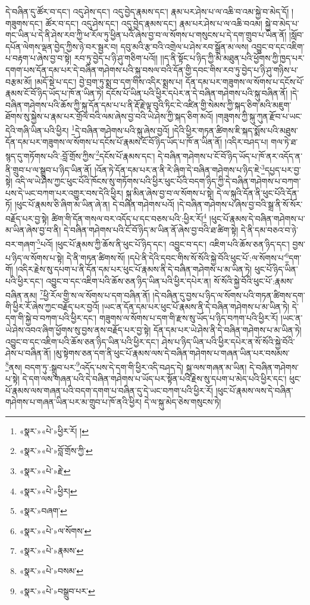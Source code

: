 དེ་བཞིན་དུ་ཚོར་བ་དང་། འདུ་ཤེས་དང་། འདུ་བྱེད་རྣམས་དང་། རྣམ་པར་ཤེས་པ་ལ་འཆི་བ་འམ་སྐྱེ་བ་མེད་དོ། །གཟུགས་དང་། ཚོར་བ་དང་། འདུ་ཤེས་དང་། འདུ་བྱེད་རྣམས་དང་། རྣམ་པར་ཤེས་པ་ལ་འཆི་བའམ། སྐྱེ་བ་མེད་པ་གང་ཡིན་པ་དེ་ནི་ཤེས་རབ་ཀྱི་ཕ་རོལ་ཏུ་ཕྱིན་པའོ་ཞེས་བྱ་བ་ལ་སོགས་པ་གསུངས་པ་དེ་དག་གྲུབ་པ་ཡིན་ནོ། །སློབ་དཔོན་ལེགས་ལྡན་བྱེད་ཀྱིས་ཉེ་བར་སྦྱར་བ། དབུ་མའི་རྩ་བའི་འགྲེལ་པ་ཤེས་རབ་སྒྲོན་མ་ལས། འབྱུང་བ་དང་འཇིག་པ་བརྟག་པ་ཞེས་བྱ་བ་སྟེ། རབ་ཏུ་བྱེད་པ་ཉི་ཤུ་གཅིག་པའོ།། །།ད་ནི་སྟོང་པ་ཉིད་ཀྱི་མི་མཐུན་པའི་ཕྱོགས་ཀྱི་ཁྱད་པར་དགག་པས་དོན་དམ་པར་དེ་བཞིན་གཤེགས་པའི་སྐུ་བསལ་བའི་དོན་གྱི་དབང་གིས་རབ་ཏུ་བྱེད་པ་ཉི་ཤུ་གཉིས་པ་བརྩམ་མོ། །མདོ་སྡེ་པ་དང་། བྱེ་བྲག་ཏུ་སྨྲ་བ་དག་གིས་འདིར་སྨྲས་པ། དོན་དམ་པར་གཟུགས་ལ་སོགས་པ་དངོས་པོ་རྣམས་ངོ་བོ་ཉིད་ཡོད་པ་ཁོ་ན་ཡིན་ཏེ། དངོས་པོ་ཡིན་པའི་ཕྱིར་དཔེར་ན་དེ་བཞིན་གཤེགས་པའི་སྐུ་བཞིན་ནོ། །དེ་བཞིན་གཤེགས་པའི་ཆོས་ཀྱི་སྐུ་དོན་དམ་པ་པ་ནི་རྡོ་རྗེ་ལྟ་བུའི་ཏིང་ངེ་འཛིན་གྱི་སེམས་ཀྱི་སྐད་ཅིག་མའི་མཇུག་ཐོགས་སུ་སྐྱེས་པ་རྣམ་པར་གྲོལ་བའི་ལམ་ཞེས་བྱ་བའི་ཡེ་ཤེས་ཀྱི་སྐད་ཅིག་མའོ། །གཟུགས་ཀྱི་སྐུ་ཀུན་རྫོབ་པ་ཡང་དེའི་གཞི་ཡིན་པའི་ཕྱིར། \footnote{«སྣར་»«པེ་»ཕྱིར་རོ། ། }དེ་བཞིན་གཤེགས་པའི་སྐུ་ཞེས་བྱའོ། །དེའི་ཕྱིར་གཏན་ཚིགས་ཇི་སྐད་སྨོས་པའི་མཐུས་དོན་དམ་པར་གཟུགས་ལ་སོགས་པ་དངོས་པོ་རྣམས་ངོ་བོ་ཉིད་ཡོད་པ་ཁོ་ན་ཡིན་ནོ། །འདིར་བཤད་པ། གལ་ཏེ་ཐ་སྙད་དུ་གཏོགས་པའི་:བློ་གྲོས་ཀྱིས་\footnote{«སྣར་»«པེ་»བློ་གྲོས་ཀྱི་}དངོས་པོ་རྣམས་དང་། དེ་བཞིན་གཤེགས་པ་ངོ་བོ་ཉིད་ཡོད་པ་ཁོ་ནར་འདོད་ན་ནི་གྲུབ་པ་ལ་སྒྲུབ་པ་ཉིད་ཡིན་ནོ། །འོན་ཏེ་དོན་དམ་པར་ན་ནི་རེ་ཞིག་དེ་བཞིན་གཤེགས་པ་ཉིད་ཇེ་\footnote{«སྣར་»«པེ་»རྗེ་}དཔྱད་པར་བྱ་སྟེ། འདི་ལ་ཡེ་ཤེས་ཀྱང་ཕུང་པོའི་ཁོངས་སུ་གཏོགས་པའི་ཕྱིར་ཕུང་པོའི་བདག་ཉིད་ཀྱི་དེ་བཞིན་གཤེགས་པ་བཀག་པས་དེ་ཡང་བཀག་པར་འགྱུར་བས་དེའི་ཕྱིར། སྐུ་མིན་ཞེས་བྱ་བ་ལ་སོགས་པ་སྟེ། དེ་ལ་སྐུའི་དོན་ནི་ཕུང་པོའི་དོན་ཏོ། །ཕུང་པོ་རྣམས་ཅི་ཞིག་མ་ཡིན་ཞེ་ན། དེ་བཞིན་གཤེགས་པའོ། །དེ་བཞིན་གཤེགས་པ་ཞེས་བྱ་བའི་སྒྲ་ནི་སོ་སོར་བརྗོད་པར་བྱ་སྟེ། ཚིག་གི་དོན་གསལ་བར་འདོད་པ་དང་བཅས་པའི་:ཕྱིར་རོ།\footnote{«སྣར་»«པེ་»ཕྱིར།} །ཕུང་པོ་རྣམས་དེ་བཞིན་གཤེགས་པ་མ་ཡིན་ཞེས་བྱ་བ་ནི། དེ་བཞིན་གཤེགས་པའི་ངོ་བོ་ཉིད་མ་ཡིན་ནོ་ཞེས་བྱ་བའི་ཐ་ཚིག་སྟེ། དེ་ནི་དམ་བཅའ་བ་ཉེ་བར་གཞག་\footnote{«སྣར་»བཞག་}པའོ། །ཕུང་པོ་རྣམས་ཀྱི་ཆོས་ནི་ཕུང་པོ་ཉིད་དང་། འབྱུང་བ་དང་། འཇིག་པའི་ཆོས་ཅན་ཉིད་དང་། བྱས་པ་ཉིད་ལ་སོགས་པ་སྟེ། དེ་ནི་གཏན་ཚིགས་སོ། །དཔེ་ནི་དེའི་དབང་གིས་སོ་སོའི་སྐྱེ་བོའི་ཕུང་པོ་:ལ་སོགས་པ་\footnote{«སྣར་»«པེ་»ལ་སོགས་}དག་གོ། །འདིར་རྗེས་སུ་དཔག་པ་ནི་དོན་དམ་པར་ཕུང་པོ་རྣམས་ནི་དེ་བཞིན་གཤེགས་པ་མ་ཡིན་ཏེ། ཕུང་པོ་ཉིད་ཡིན་པའི་ཕྱིར་དང་། འབྱུང་བ་དང་འཇིག་པའི་ཆོས་ཅན་ཉིད་ཡིན་པའི་ཕྱིར་དཔེར་ན། སོ་སོའི་སྐྱེ་བོའི་ཕུང་པོ་:རྣམས་བཞིན་ནམ། \footnote{«སྣར་»«པེ་»རྣམས་}ཕྱི་རོལ་གྱི་ས་ལ་སོགས་པ་དག་བཞིན་ནོ། །དེ་བཞིན་དུ་བྱས་པ་ཉིད་ལ་སོགས་པའི་གཏན་ཚིགས་དག་གི་ཕྱིར་རོ་ཞེས་ཀྱང་བརྗོད་པར་བྱའོ། །ཡང་ན་དོན་དམ་པར་ཕུང་པོ་རྣམས་ནི་དེ་བཞིན་གཤེགས་པ་མ་ཡིན་ཏེ། དེ་དག་གི་སྐྱེ་བ་བཀག་པའི་ཕྱིར་དང་། གཟུགས་ལ་སོགས་པ་དག་གི་རྫས་སུ་ཡོད་པ་ཉིད་བཀག་པའི་ཕྱིར་རོ། །ཡང་ན་ཡེ་ཤེས་འབའ་ཞིག་ཕྱོགས་སུ་བྱས་ནས་བརྗོད་པར་བྱ་སྟེ། དོན་དམ་པར་ཡེ་ཤེས་ནི་དེ་བཞིན་གཤེགས་པ་མ་ཡིན་ཏེ། འབྱུང་བ་དང་འཇིག་པའི་ཆོས་ཅན་ཉིད་ཡིན་པའི་ཕྱིར་དང་། ཤེས་པ་ཉིད་ཡིན་པའི་ཕྱིར་དཔེར་ན་སོ་སོའི་སྐྱེ་བོའི་ཤེས་པ་བཞིན་ནོ། །མུ་སྟེགས་ཅན་དག་ནི་ཕུང་པོ་རྣམས་ལས་དེ་བཞིན་གཤེགས་པ་གཞན་ཡིན་པར་བསམས་\footnote{«སྣར་»«པེ་»བསམ་}ནས། བདག་ཏུ་:སྒྲུབ་པར་\footnote{«སྣར་»«པེ་»བསྒྲུབ་པར་}འདོད་པས་དེ་དག་གི་ཕྱིར་འདི་བཤད་དེ། སྐུ་ལས་གཞན་མ་ཡིན། དེ་བཞིན་གཤེགས་པ་སྟེ། དེ་དག་ལས་གཞན་པའི་དེ་བཞིན་གཤེགས་པ་ཡོད་པར་སྟོན་པའི་རྗེས་སུ་དཔག་པ་མེད་པའི་ཕྱིར་དང་། ཕུང་པོ་རྣམས་ལས་གཞན་པའི་བདག་དགག་པ་བཞིན་དུ་དེ་ཡང་བཀག་པའི་ཕྱིར་རོ། །ཕུང་པོ་རྣམས་ལས་དེ་བཞིན་གཤེགས་པ་གཞན་ཡིན་པར་མ་གྲུབ་པ་ཁོ་ནའི་ཕྱིར། དེ་ལ་སྐུ་མེད་ཅེས་གསུངས་ཏེ། 